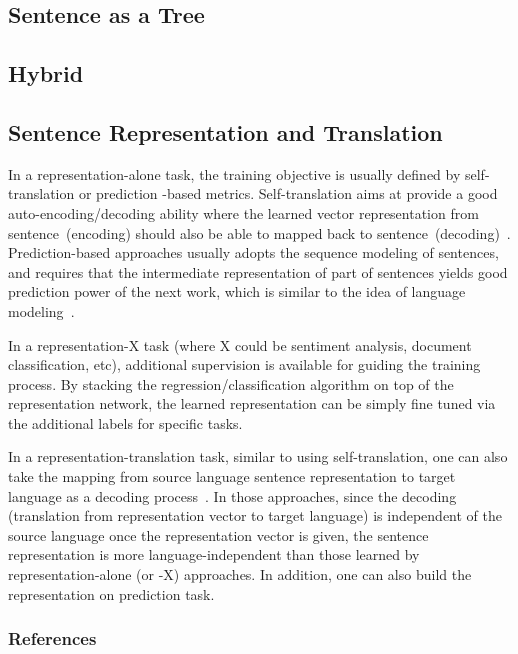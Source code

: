 \documentclass{article} %
\begin{document}
\subsection{Sentence as a Tree}
\subsection{Hybrid}
\subsection{Sentence Representation and Translation}
In a representation-alone task, the training objective is usually defined by
self-translation or prediction -based metrics. Self-translation aims at provide
a good auto-encoding/decoding ability where the learned vector representation
from sentence~(encoding) should also be able to mapped back to
sentence~(decoding)~\cite{socher2011dynamic}. Prediction-based approaches
usually adopts the sequence modeling of sentences, and requires that the
intermediate representation of part of sentences yields good prediction power
of the next work, which is similar to the idea of language
modeling~\cite{mikolov2013distributed}.

In a representation-X task (where X could be sentiment analysis, document
classification, etc), additional supervision is available for guiding the
training process. By stacking the regression/classification algorithm on top of
the representation network, the learned representation can be simply fine tuned
via the additional labels for specific tasks.

In a representation-translation task, similar to using self-translation, one can
also take the mapping from source language sentence representation to target
language as a decoding process~\cite{sutskever2014sequence,}. In those
approaches, since the decoding (translation from representation vector to target
language) is independent of the source language once the representation vector
is given, the sentence representation is more language-independent than those
learned by representation-alone (or -X) approaches. In addition, one can also
build the representation on prediction task.

\fi


\subsubsection{References}

% 

\end{document}
